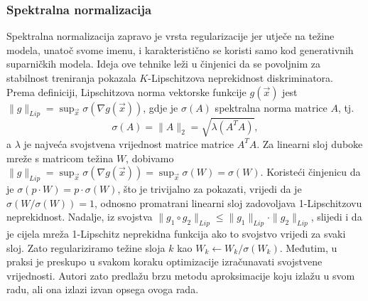 \subsubsection{Spektralna normalizacija}
Spektralna normalizacija  zapravo je vrsta regularizacije jer utječe na težine modela, unatoč svome imenu, i karakteristično se koristi samo kod generativnih suparničkih modela. Ideja ove tehnike leži u činjenici da se povoljnim za stabilnost treniranja pokazala $K$-Lipschitzova neprekidnost diskriminatora.  Prema definiciji, Lipschitzova norma vektorske funkcije $g(\vec{x})$ jest $\|g\|_{Lip} = \sup_{\vec{x}}\sigma(\nabla g(\vec{x}))$, gdje je $\sigma(A)$ spektralna norma matrice $A$, tj. 
\begin{equation}
\sigma(A) = \|A\|_2 = \sqrt{\lambda(A^T A)},
\end{equation}
a $\lambda$ je najveća svojstvena vrijednost matrice matrice $A^T A$. Za linearni sloj duboke mreže s matricom težina $W$, dobivamo $\|g\|_{Lip} = \sup_{\vec{x}}\sigma(\nabla g(\vec{x})) = \sup_{\vec{x}}\sigma(W) = \sigma(W)$. Koristeći činjenicu da je $\sigma(p \cdot W) = p \cdot \sigma(W)$, što je trivijalno za pokazati, vrijedi da je $\sigma(W / \sigma(W)) = 1$, odnosno promatrani linearni sloj zadovoljava 1-Lipschitzovu neprekidnost. Nadalje, iz svojstva $\|g_1 \circ g_2\|_{Lip} \leq \|g_1\|_{Lip} \cdot \|g_2\|_{Lip}$, slijedi i da je cijela mreža 1-Lipschitz neprekidna funkcija ako to svojstvo vrijedi za svaki sloj. Zato regulariziramo težine sloja $k$ kao $W_k \leftarrow  W_k / \sigma(W_k)$.
Međutim, u praksi je preskupo u svakom koraku optimizacije izračunavati svojstvene vrijednosti. Autori zato predlažu brzu metodu aproksimacije koju izlažu u svom radu, ali ona izlazi izvan opsega ovoga rada.

